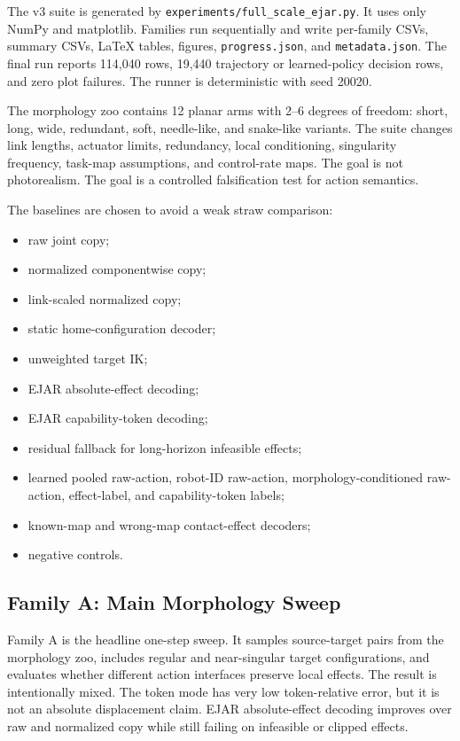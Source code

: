 \documentclass{article}
\begin{document}
The v3 suite is generated by \texttt{experiments/full\_scale\_ejar.py}. It uses only NumPy and matplotlib. Families run sequentially and write per-family CSVs, summary CSVs, LaTeX tables, figures, \texttt{progress.json}, and \texttt{metadata.json}. The final run reports 114,040 rows, 19,440 trajectory or learned-policy decision rows, and zero plot failures. The runner is deterministic with seed 20020.

The morphology zoo contains 12 planar arms with 2--6 degrees of freedom: short, long, wide, redundant, soft, needle-like, and snake-like variants. The suite changes link lengths, actuator limits, redundancy, local conditioning, singularity frequency, task-map assumptions, and control-rate maps. The goal is not photorealism. The goal is a controlled falsification test for action semantics.

The baselines are chosen to avoid a weak straw comparison:
\begin{itemize}
\item raw joint copy;
\item normalized componentwise copy;
\item link-scaled normalized copy;
\item static home-configuration decoder;
\item unweighted target IK;
\item EJAR absolute-effect decoding;
\item EJAR capability-token decoding;
\item residual fallback for long-horizon infeasible effects;
\item learned pooled raw-action, robot-ID raw-action, morphology-conditioned raw-action, effect-label, and capability-token labels;
\item known-map and wrong-map contact-effect decoders;
\item negative controls.
\end{itemize}

\subsection{Family A: Main Morphology Sweep}

Family A is the headline one-step sweep. It samples source-target pairs from the morphology zoo, includes regular and near-singular target configurations, and evaluates whether different action interfaces preserve local effects. The result is intentionally mixed. The token mode has very low token-relative error, but it is not an absolute displacement claim. EJAR absolute-effect decoding improves over raw and normalized copy while still failing on infeasible or clipped effects.
\end{document}
